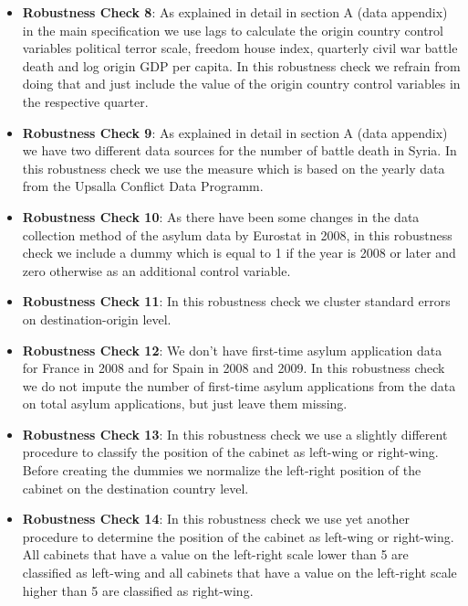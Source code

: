 \documentclass[11pt,a4paper]{scrartcl}
\begin{document}
\begin{itemize}
	\item \textbf{Robustness Check 8}: As explained in detail in section A (data appendix) in the main specification we use lags to calculate the origin country control variables political terror scale, freedom house index, quarterly civil war battle death and log origin GDP per capita. In this robustness check we refrain from doing that and just include the value of the origin country control variables in the respective quarter.
	
	\item \textbf{Robustness Check 9}: As explained in detail in section A (data appendix) we have two different data sources for the number of battle death in Syria. In this robustness check we use the measure which is based on the yearly data from the Upsalla Conflict Data Programm.
	
	\item \textbf{Robustness Check 10}: As there have been some changes in the data collection method of the asylum data by Eurostat in 2008, in this robustness check we include a dummy which is equal to 1 if the year is 2008 or later and zero otherwise as an additional control variable. 
	
	\item \textbf{Robustness Check 11}: In this robustness check we cluster standard errors on destination-origin level. 
	
	\item \textbf{Robustness Check 12}: We don't have first-time asylum application data for France in 2008 and for Spain in 2008 and 2009. In this robustness check we do not impute the number of first-time asylum applications from the data on total asylum applications, but just leave them missing.   
	
	\item \textbf{Robustness Check 13}:  In this robustness check we use a slightly different procedure to classify the position of the cabinet as left-wing or right-wing. Before creating the dummies we normalize the left-right position of the cabinet on the destination country level.
	
	\item \textbf{Robustness Check 14}: In this robustness check we use yet another procedure to determine the position of the cabinet as left-wing or right-wing. All cabinets that have a value on the left-right scale lower than 5 are classified as left-wing and all cabinets that have a value on the left-right scale higher than 5 are classified as right-wing.
	

\end{itemize}
\end{document}
